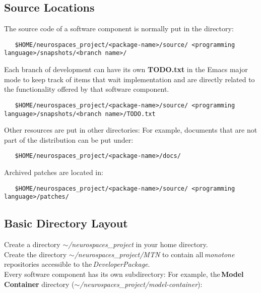 \documentclass[12pt]{article}
\begin{document}
\subsection*{Source Locations}

The source code of a software component is normally put in the directory:
\begin{verbatim}
   $HOME/neurospaces_project/<package-name>/source/ <programming language>/snapshots/<branch name>/
\end{verbatim}
Each branch of development can have its own {\bf TODO.txt} in the
Emacs major mode to keep track of items that wait implementation and
are directly related to the functionality offered by that software
component.
\begin{verbatim}
   $HOME/neurospaces_project/<package-name>/source/ <programming language>/snapshots/<branch name>/TODO.txt
\end{verbatim}
Other resources are put in other directories: For example, documents that are not part of the distribution can be put under:
\begin{verbatim}
   $HOME/neurospaces_project/<package-name>/docs/
\end{verbatim}
Archived patches are located in:
\begin{verbatim}
   $HOME/neurospaces_project/<package-name>/source/ <programming language>/patches/ 
\end{verbatim}


\subsection*{Basic Directory Layout}

Create a directory {\it $\sim$/neurospaces\_project} in your home directory. \\
\noindent Create the directory {\it $\sim$/neurospaces\_project/MTN} to contain all\,{\it monotone} repositories accessible to the\,{\it DeveloperPackage}. \\
\noindent Every software component has its own subdirectory: For example, the\,{\bf Model\,Container} directory ({\it $\sim$/neurospaces\_project/model-container}):
\end{document}
